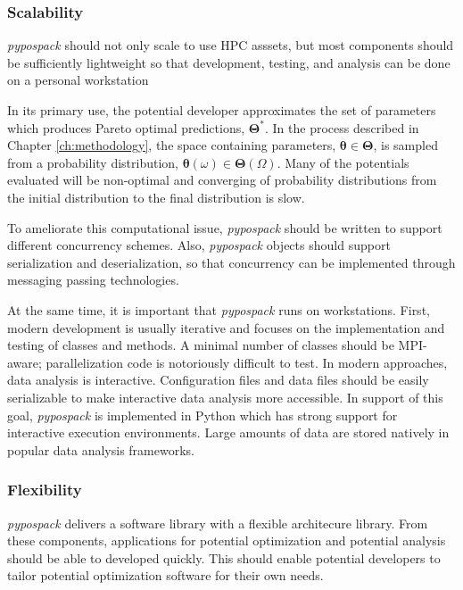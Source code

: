 \subsubsection{Scalability}

\emph{pypospack} should not only scale to use HPC asssets, but most components should be sufficiently lightweight so that development, testing, and analysis can be done on a personal workstation

In its primary use, the potential developer approximates the set of parameters  which produces Pareto optimal predictions, $\bm{\Theta}^*$.
In the process described in Chapter \ref{ch:methodology}, the space containing parameters, $\bm{\theta} \in \bm{\Theta}$, is sampled from a probability distribution, $\bm{\theta}(\omega) \in \bm{\Theta}(\Omega)$.
Many of the potentials evaluated will be non-optimal and converging of probability distributions from the initial distribution to the final distribution is slow.

To ameliorate this computational issue, \emph{pypospack} should be written to support different concurrency schemes.  Also, \emph{pypospack} objects should support serialization and deserialization, so that concurrency can be implemented through messaging passing technologies.

At the same time, it is important that \emph{pypospack} runs on workstations.  First, modern development is usually iterative and focuses on the implementation and testing of classes and methods.  A minimal number of classes should be MPI-aware; parallelization code is notoriously difficult to test.
In modern approaches, data analysis is interactive.  Configuration files and data files should be easily serializable to make interactive data analysis more accessible.
In support of this goal, \emph{pypospack} is implemented in Python which has strong support for interactive execution environments.  Large amounts of data are stored natively in popular data analysis frameworks.

\subsubsection{Flexibility}

\emph{pypospack} delivers a software library with a flexible architecure library.  From these components, applications for potential optimization and potential analysis should be able to developed quickly.  This should enable potential developers to tailor potential optimization software for their own needs.

